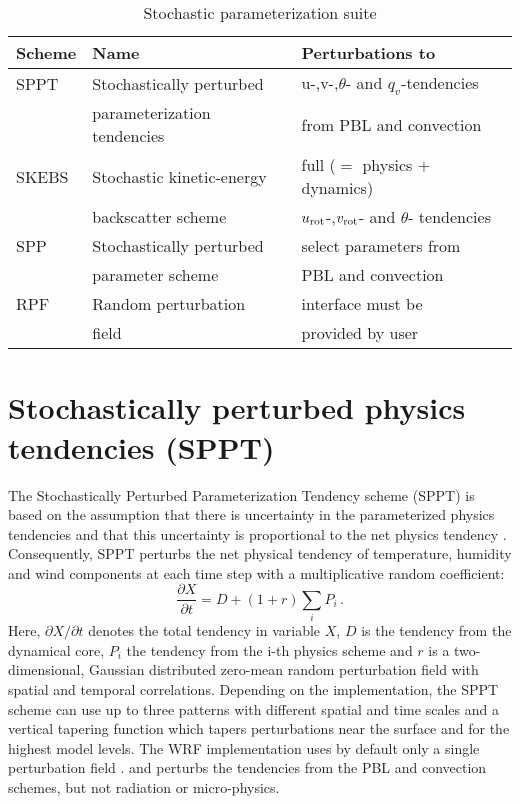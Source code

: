\begin{table}[!ht]
\begin{center}
\caption{Stochastic parameterization suite}
\begin{tabular}{ | l | l | l |}
\hline
Scheme          & Name & Perturbations to \\ 
\hline
SPPT  & Stochastically perturbed    &  u-,v-,$\theta$- and $q_v$-tendencies\\
      & parameterization tendencies &  from PBL and convection\\
SKEBS & Stochastic kinetic-energy   &  full ($=$ physics + dynamics) \\
      & backscatter scheme          &  $u_{\rm rot}$-,$v_{\rm rot}$- and $\theta$- tendencies\\ 
SPP & Stochastically perturbed      &  select parameters from\\
    & parameter scheme              &  PBL and convection \\
RPF & Random perturbation           &  interface must be \\
    & field                         &  provided by user\\
\hline
\end{tabular}
\end{center}
\label{stoch_table}
\end{table}

\section {Stochastically perturbed physics tendencies (SPPT)}
The Stochastically Perturbed Parameterization Tendency scheme
(SPPT) is based on the assumption that there is uncertainty
in the parameterized physics tendencies and that this 
uncertainty is proportional to the net physics tendency \citep{Bu99,Pa09}.
Consequently, SPPT perturbs the net physical tendency of temperature, 
humidity and wind components at each time step with a multiplicative 
random coefficient:
\begin{equation}
   \frac{\partial X}{\partial t}= D + (1+ r) \sum_i P_i \,.
\end{equation}
Here, ${\partial X}/{\partial t}$ denotes the total tendency in variable $X$, 
$D$ is the tendency from the dynamical core, 
$P_i$ the tendency from the i-th physics scheme 
and $r$ is a two-dimensional, Gaussian distributed zero-mean random
perturbation field with spatial and temporal correlations. 
Depending on
the implementation, the SPPT scheme can use up to three patterns with
different spatial and time scales and a vertical tapering function which 
tapers perturbations near the surface and for the highest model levels.
The WRF implementation uses by default only a single perturbation field \citep{Be15}.
and perturbs the tendencies from the PBL and convection schemes, but not radiation
or micro-physics.

